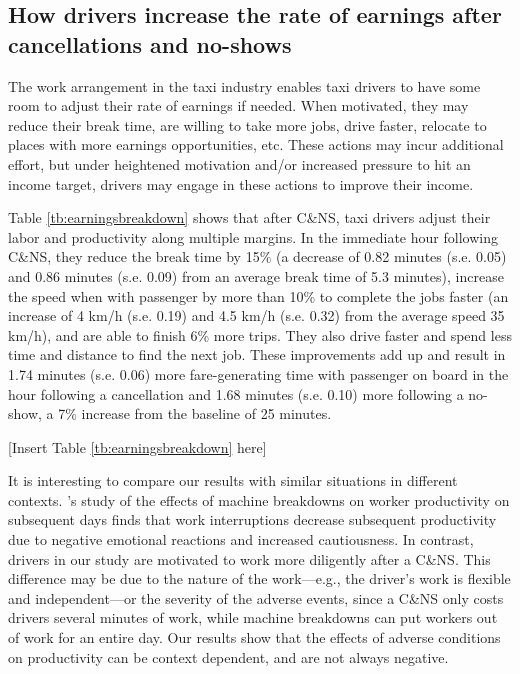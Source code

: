 \documentclass[reviewmode,AEJ]{AEA}
\begin{document}
\subsection{How drivers increase the rate of earnings after cancellations and no-shows}
The work arrangement in the taxi industry enables taxi drivers to have some room to adjust their rate of earnings if needed. When motivated, they may reduce their break time, are willing to take more jobs, drive faster, relocate to places with more earnings opportunities, etc. These actions may incur additional effort, but under heightened motivation and/or increased pressure to hit an income target, drivers may engage 
in these actions to improve their income.

Table \ref{tb:earningsbreakdown} shows that after C\&NS, taxi drivers adjust their labor and productivity along multiple margins. In the immediate hour following C\&NS, they reduce the break time by 15\% (a decrease of 0.82 minutes (s.e. 0.05) and 0.86 minutes (s.e. 0.09) from an average break time of 5.3 minutes), increase the speed when with passenger by more than 10\% to complete the jobs faster (an increase of 4 km/h (s.e. 0.19) and 4.5 km/h (s.e. 0.32) from the average speed 35 km/h), and are able to finish 6\% more trips. They also drive faster and spend less time and distance to find the next job. These improvements add up and result in 1.74 minutes (s.e. 0.06) more fare-generating time with passenger on board in the hour following a cancellation and 1.68 minutes (s.e. 0.10) more following a no-show, a 7\% increase from the baseline of 25 minutes.  

\begin{center}
	[Insert Table \ref{tb:earningsbreakdown} here]
\end{center}


It is interesting to compare our results with similar situations in different contexts. 
\citeauthor{cai2017recover}'s \citeyear{cai2017recover} study of the effects of  machine breakdowns on worker 
productivity on subsequent days finds that work interruptions decrease subsequent productivity due to
negative emotional reactions and increased cautiousness. In contrast, drivers in our study are motivated 
to work more diligently after a C\&NS. This difference may be due to the nature of the work---e.g., the 
driver's work is flexible and independent---or the severity of the adverse events, since a C\&NS only costs
drivers several minutes of work, while machine breakdowns can put workers out of work for an entire day.
Our results show that the %
effects of adverse conditions on productivity can be context dependent,
and are not always negative.
\end{document}
